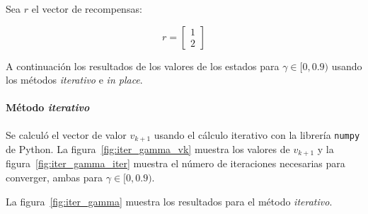 Sea $r$ el vector de recompensas:

\[
  r = \begin{bmatrix} 1 \\ 2 \end{bmatrix}
\]

A continuación los resultados de los valores de los estados para $\gamma \in [0, 0.9)$ usando los métodos \textit{iterativo} e \textit{in place}.

\paragraph{Método \textit{iterativo}} Se calculó el vector de valor $v_{k+1}$ usando el cálculo iterativo con la librería \texttt{numpy} de Python\footnotemark.
La figura~\ref{fig:iter_gamma_vk} muestra los valores de $v_{k+1}$ y la figura~\ref{fig:iter_gamma_iter} muestra el número de iteraciones necesarias para converger, ambas para $\gamma \in [0, 0.9)$.


La figura~\ref{fig:iter_gamma} muestra los resultados para el método \textit{iterativo}.

